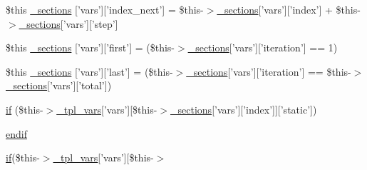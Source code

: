 \begin{DoxyCompactItemize}
\$this \hyperlink{default_234d6fa4bfd5eef6424a9ddc74a166350_2_06_06708_05_06_06708843835_05var_8tpl_8php_a38ef36263bea8f6e30e853f3ec73aba0}{\-\_\-sections} \mbox{[}'vars'\mbox{]}\mbox{[}'index\-\_\-next'\mbox{]} = \$this-\/$>$\hyperlink{_06_06127_05_06_0612781687_05pkgelementindex_8tpl_8php_a9e3d26b39edfe29c3f29b8035ef33828}{\-\_\-sections}\mbox{[}'vars'\mbox{]}\mbox{[}'index'\mbox{]} + \$this-\/$>$\hyperlink{_06_06127_05_06_0612781687_05pkgelementindex_8tpl_8php_a9e3d26b39edfe29c3f29b8035ef33828}{\-\_\-sections}\mbox{[}'vars'\mbox{]}\mbox{[}'step'\mbox{]}
\item 
\$this \hyperlink{default_234d6fa4bfd5eef6424a9ddc74a166350_2_06_06708_05_06_06708843835_05var_8tpl_8php_ac7d489d6235f877b39f5c4ed036ce7f2}{\-\_\-sections} \mbox{[}'vars'\mbox{]}\mbox{[}'first'\mbox{]} = (\$this-\/$>$\hyperlink{_06_06127_05_06_0612781687_05pkgelementindex_8tpl_8php_a9e3d26b39edfe29c3f29b8035ef33828}{\-\_\-sections}\mbox{[}'vars'\mbox{]}\mbox{[}'iteration'\mbox{]} == 1)
\item 
\$this \hyperlink{default_234d6fa4bfd5eef6424a9ddc74a166350_2_06_06708_05_06_06708843835_05var_8tpl_8php_afa5470188a44c6df05dc1e839e36816c}{\-\_\-sections} \mbox{[}'vars'\mbox{]}\mbox{[}'last'\mbox{]} = (\$this-\/$>$\hyperlink{_06_06127_05_06_0612781687_05pkgelementindex_8tpl_8php_a9e3d26b39edfe29c3f29b8035ef33828}{\-\_\-sections}\mbox{[}'vars'\mbox{]}\mbox{[}'iteration'\mbox{]} == \$this-\/$>$\hyperlink{_06_06127_05_06_0612781687_05pkgelementindex_8tpl_8php_a9e3d26b39edfe29c3f29b8035ef33828}{\-\_\-sections}\mbox{[}'vars'\mbox{]}\mbox{[}'total'\mbox{]})
\item 
\hyperlink{default_234d6fa4bfd5eef6424a9ddc74a166350_2_06_06708_05_06_06708843835_05var_8tpl_8php_aea33528ec20d969acff726018a566eb2}{if} (\$this-\/$>$\hyperlink{_06_06127_05_06_0612781687_05pkgelementindex_8tpl_8php_a4a4846d8e68d455590131a05697f67a3}{\-\_\-tpl\-\_\-vars}\mbox{[}'vars'\mbox{]}\mbox{[}\$this-\/$>$\hyperlink{_06_06127_05_06_0612781687_05pkgelementindex_8tpl_8php_a9e3d26b39edfe29c3f29b8035ef33828}{\-\_\-sections}\mbox{[}'vars'\mbox{]}\mbox{[}'index'\mbox{]}\mbox{]}\mbox{[}'static'\mbox{]})
\item 
\hyperlink{default_234d6fa4bfd5eef6424a9ddc74a166350_2_06_06708_05_06_06708843835_05var_8tpl_8php_a82cd33ca97ff99f2fcc5e9c81d65251b}{endif}
\item 
\hyperlink{_setup_8inc_8php_ad0184337b31d13763ec8751feff4aabe}{if}(\$this-\/$>$\hyperlink{_06_06127_05_06_0612781687_05pkgelementindex_8tpl_8php_a4a4846d8e68d455590131a05697f67a3}{\-\_\-tpl\-\_\-vars}\mbox{[}'vars'\mbox{]}\mbox{[}\$this-\/$>$\*

\end{DoxyCompactItemize}
